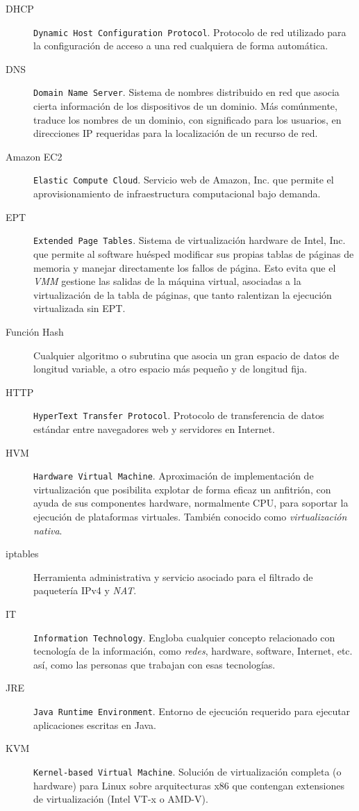 \begin{description}
\item[DHCP] \texttt{Dynamic Host Configuration Protocol}. Protocolo de red utilizado para la configuraci\'on de acceso a una red cualquiera de forma autom\'atica.
\item[DNS] \texttt{Domain Name Server}. Sistema de nombres distribuido en red que asocia cierta informaci\'on de los dispositivos de un dominio. M\'as com\'unmente, traduce los nombres de un dominio, con significado para los usuarios, en direcciones IP requeridas para la localizaci\'on de un recurso de red.
\item[Amazon EC2] \texttt{Elastic Compute Cloud}. Servicio web de Amazon, Inc. que permite el aprovisionamiento de infraestructura computacional bajo demanda.
\item[EPT] \texttt{Extended Page Tables}. Sistema de virtualizaci\'on hardware de Intel, Inc. que permite al software hu\'esped modificar sus propias tablas de p\'aginas de memoria y manejar directamente los fallos de p\'agina. Esto evita que el \emph{VMM} gestione las salidas de la m\'aquina virtual, asociadas a la virtualizaci\'on de la tabla de p\'aginas, que tanto ralentizan la ejecuci\'on virtualizada sin EPT.
\item[Funci\'on Hash] Cualquier algoritmo o subrutina que asocia un gran espacio de datos de longitud variable, a otro espacio m\'as peque\~no y de longitud fija.
\item[HTTP] \texttt{HyperText Transfer Protocol}. Protocolo de transferencia de da\-tos est\'andar entre navegadores web y servidores en Internet.
\item[HVM] \texttt{Hardware Virtual Machine}. Aproximaci\'on de implementaci\'on de virtualizaci\'on que posibilita explotar de forma eficaz un anfitri\'on, con ayuda de sus componentes hardware, normalmente CPU, para soportar la ejecuci\'on de plataformas virtuales. Tambi\'en conocido como \emph{vir\-tua\-li\-za\-ci\'on nativa}.
\item[iptables] Herramienta administrativa y servicio asociado para el filtrado de paqueter\'ia IPv4 y \emph{NAT}.
\item[IT] \texttt{Information Technology}. Engloba cualquier concepto relacionado con tecnolog\'ia de la informaci\'on, como \emph{redes}, hardware, software, Internet, etc. as\'i, como las personas que trabajan con esas tecnolog\'ias.
\item[JRE] \texttt{Java Runtime Environment}. Entorno de ejecuci\'on requerido para ejecutar aplicaciones escritas en Java.
\item[KVM] \texttt{Kernel-based Virtual Machine}. Soluci\'on de virtualizaci\'on completa (o hardware) para Linux sobre arquitecturas x86 que contengan extensiones de virtualizaci\'on (Intel VT-x o AMD-V).

\end{description}
